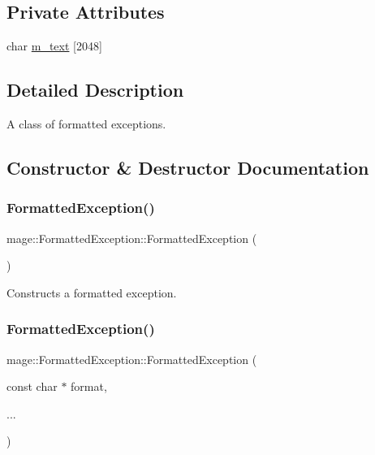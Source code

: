 \subsection*{Private Attributes}
\begin{DoxyCompactItemize}
\item 
char \hyperlink{structmage_1_1_formatted_exception_aadccdcc1db09285dadc6b5a30681e05b}{m\+\_\+text} \mbox{[}2048\mbox{]}
\end{DoxyCompactItemize}


\subsection{Detailed Description}
A class of formatted exceptions. 

\subsection{Constructor \& Destructor Documentation}
\hypertarget{structmage_1_1_formatted_exception_a77b82a969ec33a3aacec74a5adc4ab8b}{}\label{structmage_1_1_formatted_exception_a77b82a969ec33a3aacec74a5adc4ab8b} 
\subsubsection{\texorpdfstring{Formatted\+Exception()}{FormattedException()}\hspace{0.1cm}{\footnotesize\ttfamily [1/4]}}
{\footnotesize\ttfamily mage\+::\+Formatted\+Exception\+::\+Formatted\+Exception (\begin{DoxyParamCaption}{ }\end{DoxyParamCaption})}

Constructs a formatted exception. \hypertarget{structmage_1_1_formatted_exception_a3fe833a49052a2db99c023b1b1d43621}{}\label{structmage_1_1_formatted_exception_a3fe833a49052a2db99c023b1b1d43621} 
\subsubsection{\texorpdfstring{Formatted\+Exception()}{FormattedException()}\hspace{0.1cm}{\footnotesize\ttfamily [2/4]}}
{\footnotesize\ttfamily mage\+::\+Formatted\+Exception\+::\+Formatted\+Exception (\begin{DoxyParamCaption}\item[{const char $\ast$}]{format,  }\item[{}]{... }\end{DoxyParamCaption})\hspace{0.3cm}{\ttfamily [explicit]}}

